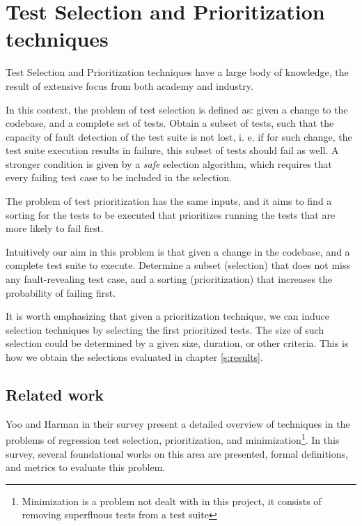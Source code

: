 \section{Test Selection and Prioritization techniques}\label{s:tsp-tech}

Test Selection and Prioritization techniques have a large body of knowledge,
the result of extensive focus from both academy and industry.

In this context, the problem of test selection is defined as: given a change
to the codebase, and a complete set of tests. Obtain a subset of tests,
such that the capacity of fault detection of the test suite is not lost, i. e.
if for such change, the test suite execution results in failure, this subset
of tests should fail as well. A stronger condition is given by a \emph{safe} 
selection algorithm, which requires that every failing test case to be included in the selection.

The problem of test prioritization has the same inputs, and it aims to find a
sorting for the tests to be executed that prioritizes running the tests that
are more likely to fail first.

Intuitively our aim in this problem is that given a change in the codebase,
and a complete test suite to execute. Determine a subset (selection) that
does not miss any fault-revealing test case, and a sorting (prioritization)
that increases the probability of failing first.

It is worth emphasizing that given a prioritization technique, we can induce
selection techniques by selecting the first prioritized tests. The size of
such selection could be determined by a given size, duration, or other criteria.
This is how we obtain the selections evaluated in chapter \ref{s:results}.

\subsection{Related work}
\label{sec:bg-tsp-related-work}

Yoo and Harman in their survey \cite{Yoo2012RegressionTM} present a detailed overview of techniques in the problems of
regression test selection, prioritization, and minimization\footnote{Minimization is a problem not dealt with in this project, it consists of removing superfluous tests from a test suite}.
 In this survey, several foundational works on this area are presented, formal definitions, and metrics to evaluate this problem.


